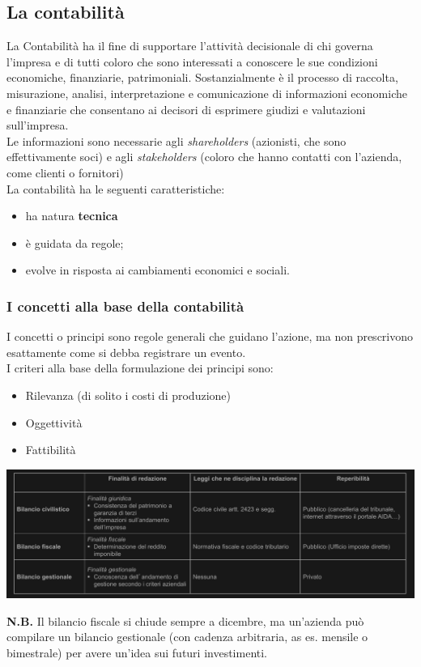 \documentclass{article}
\begin{document}
\subsection{La contabilità}
La Contabilità ha il fine di supportare
l'attività decisionale di chi governa
l'impresa e di tutti coloro che sono
interessati a conoscere le sue condizioni
economiche, finanziarie, patrimoniali. Sostanzialmente è il
processo di raccolta, misurazione, analisi,
interpretazione e comunicazione di
informazioni economiche e finanziarie che
consentano ai decisori di esprimere giudizi
e valutazioni sull'impresa.\\
Le informazioni sono necessarie agli \textit{shareholders} (azionisti, che sono effettivamente soci) e agli \textit{stakeholders} (coloro che hanno contatti con l'azienda, come clienti o fornitori)
\vspace*{0.1cm}\\
La contabilità ha le
seguenti caratteristiche: 
\begin{itemize}
    \item ha natura \textbf{tecnica}
    \item è guidata da regole;
    \item evolve in risposta ai cambiamenti
    economici e sociali.
\end{itemize}


\subsubsection{I concetti alla base
della contabilità}
I concetti o principi sono regole generali
che guidano l'azione, ma non prescrivono
esattamente come si debba registrare un
evento.
\vspace*{0.1cm}\\
I criteri alla base della formulazione dei
principi sono:
\begin{itemize}
	\item Rilevanza (di solito i costi di produzione)
    \item Oggettività
    \item Fattibilità
\end{itemize}
\noindent{}
\begin{center}
    \includegraphics[scale=0.4]{Image/Tabella bilancio.png}
\end{center}
\textbf{N.B.} Il bilancio fiscale si chiude sempre a dicembre, ma un'azienda può compilare un bilancio gestionale (con cadenza arbitraria, as es. mensile o bimestrale) per avere un'idea sui futuri investimenti.
\end{document}
